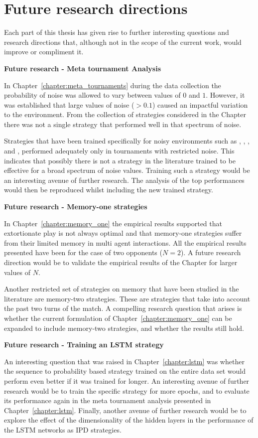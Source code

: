 \section{Future research directions}

Each part of this thesis has given rise to further interesting questions and
research directions that, although not in the scope of the current work, would
improve or compliment it.

\textbf{Future research - Meta tournament Analysis}

In Chapter~\ref{chapter:meta_tournaments} during the data collection the
probability of noise was allowed to vary between values of \(0\) and \(1\).
However, it was established that large values of noise (\(>
0.1\)) caused an impactful variation to the environment. From the collection of
\numberofstrategies strategies considered in the Chapter there was not a single
strategy that performed well in that spectrum of noise.

Strategies that have been trained specifically for noisy environments such
as \DBS, \EvolvedFSMSixTeenNoiseZeroFive, \EvolvedANNFiveNoiseZeroFive, \PSOGamblerTwoTwoTwoNoiseZeroFive
and \OmegaTFT, performed adequately only in tournaments with restricted
noise. This indicates that possibly there is not a strategy in the literature
trained to be effective for a broad spectrum of noise values. Training such
a strategy would be an interesting avenue of further research. The analysis of the
top performances would then be reproduced whilst including the new trained strategy.

\textbf{Future research - Memory-one strategies}

In Chapter~\ref{chapter:memory_one} the empirical results supported that
extortionate play is not always optimal and that memory-one strategies suffer
from their limited memory in multi agent interactions. All the empirical results
presented have been for the case of two opponents (\(N=2\)). A
future research direction would be to validate the empirical results of the Chapter for
larger values of \(N\).

Another restricted set of strategies on memory that have been studied in the literature
are memory-two strategies. These are strategies that take into account the past
two turns of the match. A compelling research question that arises is whether
the current formulation of Chapter~\ref{chapter:memory_one} can be expanded to
include memory-two strategies, and whether the results still hold.

\textbf{Future research - Training an LSTM strategy}

An interesting question that was raised in Chapter~\ref{chapter:lstm} was
whether the sequence to probability based strategy trained on the entire data
set would perform even better if it was trained for longer. An interesting
avenue of further research would be to train the specific strategy for more
epochs, and to evaluate its performance again in the meta tournament analysis
presented in Chapter~\ref{chapter:lstm}. Finally, another avenue of further
research would be to explore the effect of the dimensionality of the hidden
layers in the performance of the LSTM networks as IPD strategies.
